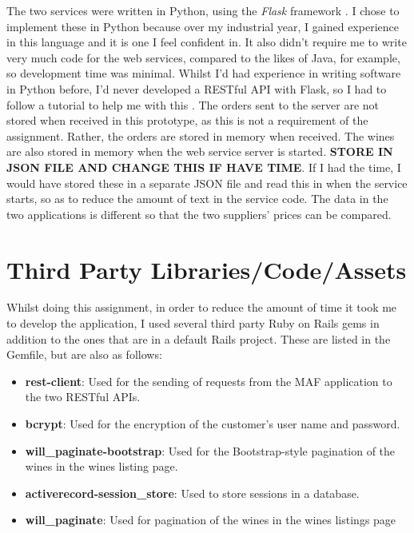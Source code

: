 \documentclass[a4paper,12pt,hidelinks]{report}
\begin{document}
    The two services were written in Python, using the \textit{Flask} framework \cite{flask-framework}. I chose to implement these in Python because over my industrial 
    year, I gained experience in this language and it is one I feel confident in. It also didn't require me to write very much code for the web services, compared to the likes of
    Java, for example, so development time was minimal. Whilst I'd had experience in writing software in Python before, I'd never developed a RESTful API with Flask,
    so I had to follow a tutorial to help me with this \cite{flask-tutorial}. The orders sent to the server are not stored when received in this prototype, as this
    is not a requirement of the assignment. Rather, the orders are stored in memory when received. The wines are also stored in memory when the web service server is
    started. \textbf{STORE IN JSON FILE AND CHANGE THIS IF HAVE TIME}. If I had the time, I would have stored these in a separate JSON file and read this in when the service
    starts, so as to reduce the amount of text in the service code. The data in the two applications is different so that the two suppliers' prices can be compared.

\chapter{Third Party Libraries/Code/Assets}
    Whilst doing this assignment, in order to reduce the amount of time it took me to develop the application, I used several third party
    Ruby on Rails gems in addition to the ones that are in a default Rails project. These are listed in the Gemfile, but are also as follows:
    \begin{itemize}
        \item \textbf{rest-client}: Used for the sending of requests from the MAF application to the two RESTful APIs.
        \item \textbf{bcrypt}: Used for the encryption of the customer's user name and password.
        \item \textbf{will\_paginate-bootstrap}: Used for the Bootstrap-style pagination of the wines in the wines listing page.
        \item \textbf{activerecord-session\_store}: Used to store sessions in a database.
        \item \textbf{will\_paginate}: Used for pagination of the wines in the wines listings page
    \end{itemize}
\end{document}
